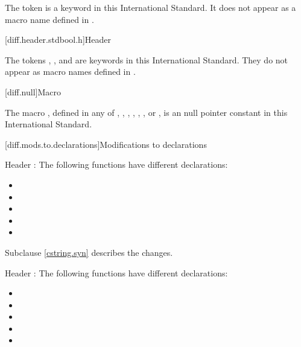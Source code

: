 \pnum
The token  is a keyword in this International
Standard. It does not appear as a macro name defined
in .

[diff.header.stdbool.h]{Header }
%

\pnum
The tokens , , and 
are keywords in this International Standard.
They do not appear as macro names defined in
.

[diff.null]{Macro }

\pnum
The macro
,
defined in any of
,
,
,
,
,
,
or ,
is an  \Cpp null pointer constant in
this International Standard.

[diff.mods.to.declarations]{Modifications to declarations}

\pnum
Header :
The following functions have different declarations:

\begin{itemize}
\item {}
\item {}
\item {}
\item {}
\item {}
\end{itemize}

Subclause \ref{cstring.syn} describes the changes.

\pnum
Header :
The following functions have different declarations:

\begin{itemize}
\item {}
\item {}
\item {}
\item {}
\item {}
\end{itemize}

